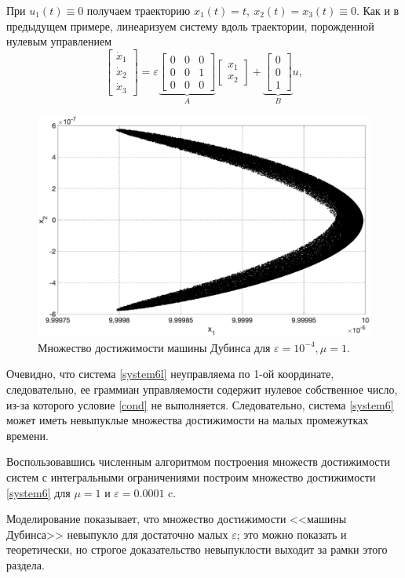 \documentclass[../main.tex]{subfiles}
\begin{document}
 При $  u_1(t) \equiv 0 $ получаем траекторию $ x_1(t) = t, \ x_2(t) = x_3(t) \equiv 0 $. Как и в предыдущем примере, линеаризуем систему вдоль траектории, порожденной нулевым управлением
 \begin{equation}\label{system6l}
	 \left[ {\begin{array}{*{20}{c}}
			 {{{\dot x}_1}}\\
			 {{{\dot x}_2}}\\
			 {{{\dot x}_3}}
	 \end{array}} \right] = \varepsilon \underbrace {\left[ {\begin{array}{*{20}{c}}
				 0&0&0\\
				 0&0&1\\
				 0&0&0
		 \end{array}} \right]}_A\left[ {\begin{array}{*{20}{c}}
			 {{x_1}}\\
			 {{x_2}}
	 \end{array}} \right] + \underbrace {\left[ {\begin{array}{*{20}{c}}
				 0\\
				 0\\
				 1
		 \end{array}} \right]}_Bu ,
 \end{equation}
 \begin{figure}[h]
	 \centering
	 \includegraphics[width=1\linewidth]{images/fig52.eps}
	 \caption{Множество достижимости машины Дубинса для $\varepsilon = 10^{-4}, \mu = 1$.}
	 \label{fig:fig3}
 \end{figure}
 Очевидно, что система \eqref{system6l} неуправляема по 1-ой координате, следовательно, ее граммиан управляемости содержит нулевое собственное число, из-за которого условие \eqref{cond} не выполняется. Следовательно, система \eqref{system6} может иметь невыпуклые множества достижимости на малых промежутках времени.
 
 Воспользовавшись численным алгоритмом построения множеств достижимости систем с интегральными ограничениями \cite{GusevZykov2018} построим множество достижимости \eqref{system6} для $ \mu = 1  $ и $ \varepsilon = 0.0001  $ c. 
 
 Моделирование показывает, что множество достижимости <<машины Дубинса>> невыпукло для достаточно малых $ \varepsilon $; это можно показать и теоретически, но строгое доказательство невыпуклости выходит за рамки этого раздела.
 
\end{document}
